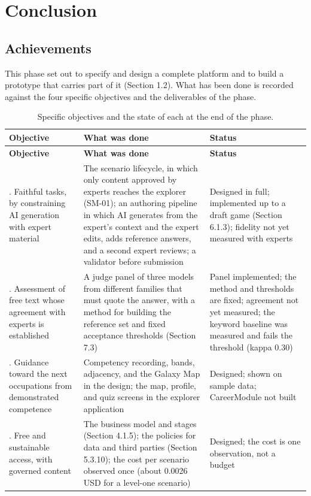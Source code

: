 \newpage
\section{Conclusion}

\subsection{Achievements}

This phase set out to specify and design a complete platform and to build a prototype that carries part of it (Section 1.2). What has been done is recorded against the four specific objectives and the deliverables of the phase.

{\small{}\renewcommand{\arraystretch}{1.1}
\begin{longtable}{|>{\raggedright\arraybackslash}p{}|>{\raggedright\arraybackslash}p{}|>{\raggedright\arraybackslash}p{}|}
\caption{Specific objectives and the state of each at the end of the phase.} \\
\hline
\textbf{Objective} & \textbf{What was done} & \textbf{Status} \\ \hline
\endfirsthead
\hline
\textbf{Objective} & \textbf{What was done} & \textbf{Status} \\ \hline
\endhead
1. Faithful tasks, by constraining AI generation with expert material & The scenario lifecycle, in which only content approved by experts reaches the explorer (SM-01); an authoring pipeline in which AI generates from the expert's context and the expert edits, adds reference answers, and a second expert reviews; a validator before submission & Designed in full; implemented up to a draft game (Section 6.1.3); fidelity not yet measured with experts \\ \hline
2. Assessment of free text whose agreement with experts is established & A judge panel of three models from different families that must quote the answer, with a method for building the reference set and fixed acceptance thresholds (Section 7.3) & Panel implemented; the method and thresholds are fixed; agreement not yet measured; the keyword baseline was measured and fails the threshold (kappa 0.30) \\ \hline
3. Guidance toward the next occupations from demonstrated competence & Competency recording, bands, adjacency, and the Galaxy Map in the design; the map, profile, and quiz screens in the explorer application & Designed; shown on sample data; CareerModule not built \\ \hline
4. Free and sustainable access, with governed content & The business model and stages (Section 4.1.5); the policies for data and third parties (Section 5.3.10); the cost per scenario observed once (about 0.0026 USD for a level-one scenario) & Designed; the cost is one observation, not a budget \\ \hline
\end{longtable}
}

